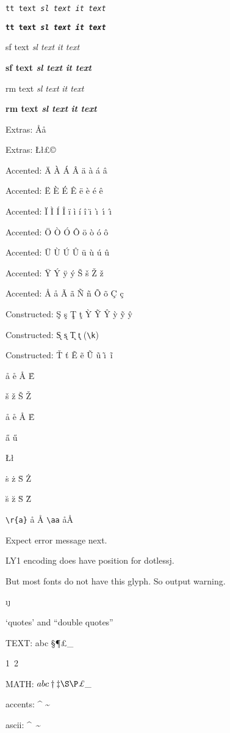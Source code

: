 \documentclass{article}
\begin{document}
\texttt{tt text \textsl{sl text} \textit{it text}}

\textbf{\texttt{tt text \textsl{sl text} \textit{it text}}}


\textsf{sf text \textsl{sl text} \textit{it text}}

\textbf{\textsf{sf text \textsl{sl text} \textit{it text}}}



\textrm{rm text \textsl{sl text} \textit{it text}}

\textbf{\textrm{rm text \textsl{sl text}  \textit{it text}}}


Extras: \TH \th \DH \dh  \AA \aa 

Extras: \L \l \pounds \copyright\ \textregistered\ \texttrademark 
 
Accented: \"A \`A \'A \^A \"a \`a \'a \^a

Accented: \"E \`E \'E \^E \"e \`e \'e \^e

Accented: \"I \`I \'I \^I \"i \`i \'i \^i  \"\i\ \`\i\ \'\i\ \^\i

Accented: \"O \`O \'O \^O \"o \`o \'o \^o

Accented: \"U \`U \'U \^U \"u \`u \'u \^u

Accented: \"Y \'Y \"y \'y \v S \v s \v Z \v z

Accented: \r A \r a \~A \~a \~N \~n \~O \~o \c C \c c

Constructed:  \c S \c s \c T \c t  \`Y  \~Y \^Y  \`y  \~y \^y


Constructed:  \k S \k s \k T \k t (\verb|\k|)

Constructed: \v T \v t \~E \~e  \~U \~u \~\i\ \~i


\r{a} \r{e} \r{A} \r{E}

\v{s} \v{z} \v{S} \v{Z}

\r{a} \r{e} \r{A} \r{E}

\H{a} \H{u} 

\L \l

\.{s} \.{z} \.{S} \.{Z}

\u{s} \u{z} \u{S} \u{Z}



\verb|\r{a}| \r{a} \r{A} \verb|\aa| \aa \AA

Expect error message next.  

LY1 encoding does have position for dotlessj.  

But most fonts do not have this glyph. So output warning.

\dh \th  \i \j

`quotes' and ``double quotes''

TEXT: abc \dag \ddag \S \P  \pounds \_


1\textordmasculine\ 2\textordfeminine 

MATH: $ abc \dagger  \ddagger  \S \P \pounds \_ $

accents: \^{} \~{} 

ascii: \textasciicircum\ \textasciitilde
\end{document}
